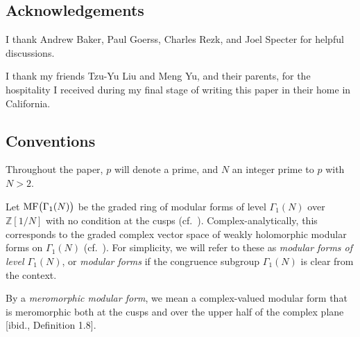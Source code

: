 \documentclass{gtpart}
\theoremstyle{definition}
\theoremstyle{remark}
\newcommand{\mb}[1]{\mathbb{#1}}
\newcommand{\BZ}{{\mb Z}}
\newcommand{\MF}{{\rm MF}}
\newcommand{\G}{\Gamma}
\renewcommand{\=}{\approx}
\renewcommand{\-}{\sim}
\numberwithin{equation}{section}
\numberwithin{thm}{section}
\begin{document}
\subsection{Acknowledgements}

I thank Andrew Baker, Paul Goerss, Charles Rezk, and Joel Specter for helpful discussions.  

I thank my friends Tzu-Yu Liu and Meng Yu, and their parents, 
for the hospitality I received during my final stage of writing this paper in their home in California.  



\subsection{Conventions}

Throughout the paper, $p$ will denote a prime, and $N$ an integer prime to $p$ with $N > 2$.  

Let $\MF\big(\G_1(N)\big)$ be the graded ring of modular forms of level $\G_1(N)$ over $\BZ[1/N]$ 
with no condition at the cusps (cf.~\cite[Section 1.2]{padicprop}).  
Complex-analytically, this corresponds to the graded complex vector space of weakly holomorphic modular forms on $\G_1(N)$ (cf.~\cite[Definition 1.12]{web}).  
For simplicity, we will refer to these as {\em modular forms of level $\G_1(N)$}, or {\em modular forms} if the congruence subgroup $\G_1(N)$ is clear from the context.  

By a {\em meromorphic modular form}, we mean a complex-valued modular form 
that is meromorphic both at the cusps and over the upper half of the complex plane [ibid., Definition 1.8].  
\end{document}
